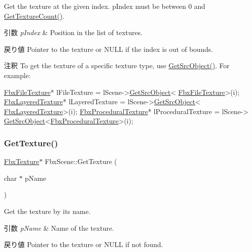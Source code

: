 Get the texture at the given index. p\+Index must be between 0 and \hyperlink{class_fbx_scene_a63041ec5c2a3f563c999ee1c20c71071}{Get\+Texture\+Count()}. 
\begin{DoxyParams}{引数}
{\em p\+Index} & Position in the list of textures. \\
\hline
\end{DoxyParams}
\begin{DoxyReturn}{戻り値}
Pointer to the texture or {\ttfamily N\+U\+LL} if the index is out of bounds. 
\end{DoxyReturn}
\begin{DoxyRemark}{注釈}
To get the texture of a specific texture type, use \hyperlink{class_fbx_object_a655ed30675d9bf1686ec075f5e7c7a84}{Get\+Src\+Object()}. For example\+: 
\begin{DoxyCode}
\hyperlink{class_fbx_file_texture}{FbxFileTexture}* lFileTexture = lScene->\hyperlink{class_fbx_object_a655ed30675d9bf1686ec075f5e7c7a84}{GetSrcObject}<
      \hyperlink{class_fbx_file_texture}{FbxFileTexture}>(i);
\hyperlink{class_fbx_layered_texture}{FbxLayeredTexture}* lLayeredTexture = lScene->\hyperlink{class_fbx_object_a655ed30675d9bf1686ec075f5e7c7a84}{GetSrcObject}<
      \hyperlink{class_fbx_layered_texture}{FbxLayeredTexture}>(i);
\hyperlink{class_fbx_procedural_texture}{FbxProceduralTexture}* lProceduralTexture = lScene->
      \hyperlink{class_fbx_object_a655ed30675d9bf1686ec075f5e7c7a84}{GetSrcObject}<\hyperlink{class_fbx_procedural_texture}{FbxProceduralTexture}>(i);
\end{DoxyCode}
 
\end{DoxyRemark}
\mbox{\label{class_fbx_scene_ab7f5f7902a4a43b5c8688a590448e70c}} 
\subsubsection{\texorpdfstring{Get\+Texture()}{GetTexture()}\hspace{0.1cm}{\footnotesize\ttfamily [2/2]}}
{\footnotesize\ttfamily \hyperlink{class_fbx_texture}{Fbx\+Texture}$\ast$ Fbx\+Scene\+::\+Get\+Texture (\begin{DoxyParamCaption}\item[{char $\ast$}]{p\+Name }\end{DoxyParamCaption})}

Get the texture by its name. 
\begin{DoxyParams}{引数}
{\em p\+Name} & Name of the texture. \\
\hline
\end{DoxyParams}
\begin{DoxyReturn}{戻り値}
Pointer to the texture or {\ttfamily N\+U\+LL} if not found. 
\end{DoxyReturn}
\mbox{\label{class_fbx_scene_a63041ec5c2a3f563c999ee1c20c71071}} 
